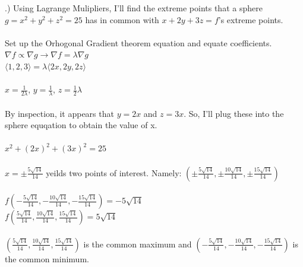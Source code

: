 \documentclass[12pt]{article}
\begin{document}
.) Using Lagrange Mulipliers, I'll find the extreme points that a sphere $g = x^{2} + y^{2} + z^{2} = 25$ has in common with $ x+2y + 3z =f$'s extreme points.\\\\
\noindent Set up the Orhogonal Gradient theorem equation and equate coefficients. \\
\noindent $\nabla f \propto \nabla g \rightarrow \nabla f = \lambda \nabla g$\\
\noindent $ \langle 1, 2, 3\rangle = \lambda \langle 2x, 2y, 2z\rangle$\\\\
\noindent $x = \frac{1}{2\lambda}$, \hspace{10pt} $y = \frac{1}{\lambda}$, \hspace{10pt} $z = \frac{1}{2}\lambda$\\\\
\noindent By inspection, it appears that $y = 2x$ and $z = 3x$. So, I'll plug these into the sphere equqation to obtain the value of x.\\\\
\noindent $x^{2} + (2x)^{2} + (3x)^{2} = 25$\\\\
\noindent $x = \pm \frac{5\sqrt{14}}{14}$ yeilds two points of interest. Namely: $(\pm \frac{5\sqrt{14}}{14}, \pm \frac{10\sqrt{14}}{14}, \pm \frac{15\sqrt{14}}{14})$\\\\
\noindent $f(- \frac{5\sqrt{14}}{14}, - \frac{10\sqrt{14}}{14},  -\frac{15\sqrt{14}}{14}) = -5\sqrt{14}$\\
\noindent $f( \frac{5\sqrt{14}}{14},  \frac{10\sqrt{14}}{14},  \frac{15\sqrt{14}}{14}) = 5\sqrt{14}$\\\\
\noindent $(\frac{5\sqrt{14}}{14},  \frac{10\sqrt{14}}{14},  \frac{15\sqrt{14}}{14})$ is the common maximum and $(- \frac{5\sqrt{14}}{14}, - \frac{10\sqrt{14}}{14},  -\frac{15\sqrt{14}}{14})$ is the common minimum. \\\\\\
\end{document}
